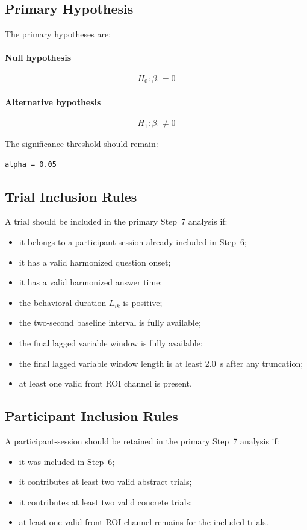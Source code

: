 \documentclass[11pt]{article}
\begin{document}
\subsection{Primary Hypothesis}
The primary hypotheses are:

\paragraph{Null hypothesis}
\begin{equation}
H_0: \beta_1 = 0
\end{equation}

\paragraph{Alternative hypothesis}
\begin{equation}
H_1: \beta_1 \neq 0
\end{equation}

The significance threshold should remain:
\begin{verbatim}
alpha = 0.05
\end{verbatim}

\subsection{Trial Inclusion Rules}
A trial should be included in the primary Step~7 analysis if:
\begin{itemize}
    \item it belongs to a participant-session already included in Step~6;
    \item it has a valid harmonized question onset;
    \item it has a valid harmonized answer time;
    \item the behavioral duration \(L_{ik}\) is positive;
    \item the two-second baseline interval is fully available;
    \item the final lagged variable window is fully available;
    \item the final lagged variable window length is at least 2.0~s after any truncation;
    \item at least one valid front ROI channel is present.
\end{itemize}

\subsection{Participant Inclusion Rules}
A participant-session should be retained in the primary Step~7 analysis if:
\begin{itemize}
    \item it was included in Step~6;
    \item it contributes at least two valid abstract trials;
    \item it contributes at least two valid concrete trials;
    \item at least one valid front ROI channel remains for the included trials.
\end{itemize}
\end{document}

